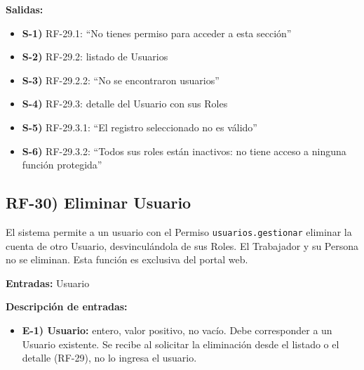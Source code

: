 \textbf{Salidas:}
\begin{itemize}[label={}, leftmargin=1.5em]
  \item \textbf{S-1)} RF-29.1: ``No tienes permiso para acceder a esta secci\'on''
  \item \textbf{S-2)} RF-29.2: listado de Usuarios
  \item \textbf{S-3)} RF-29.2.2: ``No se encontraron usuarios''
  \item \textbf{S-4)} RF-29.3: detalle del Usuario con sus Roles
  \item \textbf{S-5)} RF-29.3.1: ``El registro seleccionado no es v\'alido''
  \item \textbf{S-6)} RF-29.3.2: ``Todos sus roles est\'an inactivos: no tiene acceso a ninguna funci\'on protegida''
\end{itemize}

\subsection*{RF-30) Eliminar Usuario}
El sistema permite a un usuario con el Permiso \texttt{usuarios.gestionar} eliminar la cuenta de otro Usuario, desvincul\'andola de sus Roles. El Trabajador y su Persona no se eliminan. Esta funci\'on es exclusiva del portal web.

\textbf{Entradas:} Usuario

\textbf{Descripci\'on de entradas:}
\begin{itemize}[label={}, leftmargin=1.5em]
  \item \textbf{E-1) Usuario:} entero, valor positivo, no vac\'io. Debe corresponder a un Usuario existente. Se recibe al solicitar la eliminaci\'on desde el listado o el detalle (RF-29), no lo ingresa el usuario.
\end{itemize}

